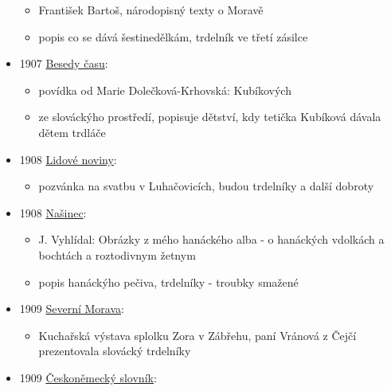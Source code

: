 \begin{itemize}
  \begin{itemize}
  \tightlist
  \item
    František Bartoš, národopisný texty o Moravě
  \item
    popis co se dává šestinedělkám, trdelník ve třetí zásilce
  \end{itemize}
\item
  1907
  \href{https://ceskadigitalniknihovna.cz/uuid/uuid:9a11a910-6d75-11e8-be68-5ef3fc9bb22f}{Besedy
  času}:

  \begin{itemize}
  \tightlist
  \item
    povídka od Marie Dolečková-Krhovská: Kubíkových
  \item
    ze slováckýho prostředí, popisuje dětství, kdy tetička Kubíková
    dávala dětem trdláče
  \end{itemize}
\item
  1908
  \href{https://www.digitalniknihovna.cz/vkol/uuid/uuid:c11919dc-435d-11dd-b505-00145e5790ea}{Lidové
  noviny}:

  \begin{itemize}
  \tightlist
  \item
    pozvánka na svatbu v Luhačovicích, budou trdelníky a další dobroty
  \end{itemize}
\item
  1908
  \href{https://ceskadigitalniknihovna.cz/uuid/uuid:d373d613-8285-11e0-b92b-0050569d679d}{Našinec}:

  \begin{itemize}
  \tightlist
  \item
    J. Vyhlídal: Obrázky z mého hanáckého alba - o hanáckých vdolkách a
    bochtách a roztodivnym žetnym
  \item
    popis hanáckýho pečiva, trdelníky - troubky smažené
  \end{itemize}
\item
  1909
  \href{https://www.digitalniknihovna.cz/vkol/uuid/uuid:8de01b83-a076-483b-b755-bd2e9de6e830}{Severní
  Morava}:

  \begin{itemize}
  \tightlist
  \item
    Kuchařská výstava splolku Zora v Zábřehu, paní Vránová z Čejčí
    prezentovala slovácký trdelníky
  \end{itemize}
\item
  1909
  \href{https://ceskadigitalniknihovna.cz/uuid/uuid:a6ed5320-aa9f-11e3-bb86-005056825209}{Českoněmecký
  slovník}:


\end{itemize}
